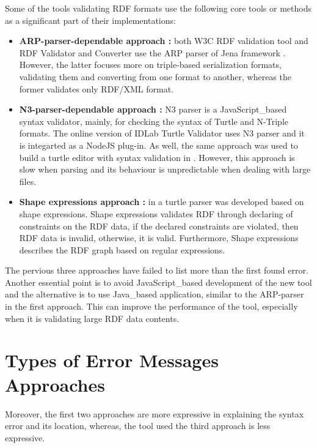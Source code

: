 Some of the tools validating RDF formats use the following core tools or methods as a significant part of their implementations: \begin{itemize}[noitemsep] 
	\item \textbf{ARP-parser-dependable approach :} both W3C RDF validation tool \cite{W3C:Validation:Online} and RDF Validator and Converter \cite{Mybluemix:Validation:Online} use the ARP parser of Jena framework \cite{McBride:2002:JSW:613357.613755}. However, the latter focuses more on triple-based serialization formats, validating them and converting from one format to another, whereas the former validates only RDF/XML format. 
	\item \textbf{N3-parser-dependable approach :} N3 parser \cite{N3Parser:Online} is a JavaScript\_based syntax validator, mainly, for checking the syntax of Turtle and N-Triple formats. The online version of IDLab Turtle Validator \cite{IDLab:Validation:Online} uses N3 parser and it is integarted as a NodeJS plug-in. As well, the same approach was used to build a turtle editor with syntax validation in \cite{petersenturtleeditor}. However, this approach is slow when parsing and its behaviour is unpredictable when dealing with large files. 
	\item \textbf{Shape expressions approach :} in \cite{prud2014shape} a turtle parser was developed based on shape expressions. Shape expressions validates RDF through declaring of constraints on the RDF data, if the declared constraints are violated, then RDF data is invalid, otherwise, it is valid. Furthermore, Shape expressions describes the RDF graph based on regular expressions. 
\end{itemize} 

The pervious three approaches have failed to list more than the first found error. Another essential point is to avoid JavaScript\_based development of the new tool and the alternative is to use Java\_based application, similar to the ARP-parser in the first approach. This can improve the performance of the tool, especially when it is validating large RDF data contents.

\section{Types of Error Messages Approaches}
Moreover, the first two approaches are more expressive in explaining the syntax error and its location, whereas, the tool used the third approach is less expressive.

